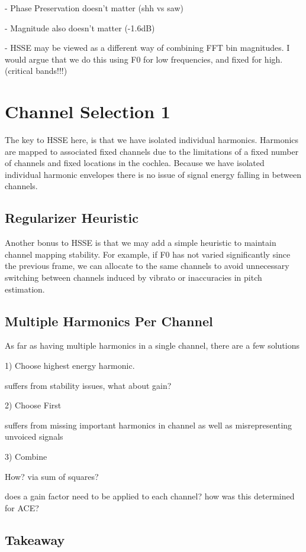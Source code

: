\documentclass [11pt, proquest] {uwthesis}[2015/03/03]
\begin{document}
 - Phase Preservation doesn't matter (shh vs saw)
 
 - Magnitude also doesn't matter (-1.6dB)
 
 - HSSE may be viewed as a different way of combining FFT bin magnitudes.  I would argue that we do this using F0 for low frequencies, and fixed for high.  (critical bands!!!)

\section{Channel Selection 1}

The key to HSSE here, is that we have isolated individual harmonics.  Harmonics are mapped to associated fixed channels due to the limitations of a fixed number of channels and fixed locations in the cochlea.  Because we have isolated individual harmonic envelopes there is no issue of signal energy falling in between channels.

\subsection{Regularizer Heuristic}

Another bonus to HSSE is that we may add a simple heuristic to maintain channel mapping stability.  For example, if F0 has not varied significantly since the previous frame, we can allocate to the same channels to avoid unnecessary switching between channels induced by vibrato or inaccuracies in pitch estimation.

\subsection{Multiple Harmonics Per Channel}
As far as having multiple harmonics in a single channel, there are a few solutions

1) Choose highest energy harmonic.

suffers from stability issues, what about gain?

2) Choose First

suffers from missing important harmonics in channel as well as misrepresenting unvoiced signals

3) Combine

How?  via sum of squares?

does a gain factor need to be applied to each channel?  how was this determined for ACE?

\subsection{Takeaway}
\end{document}

